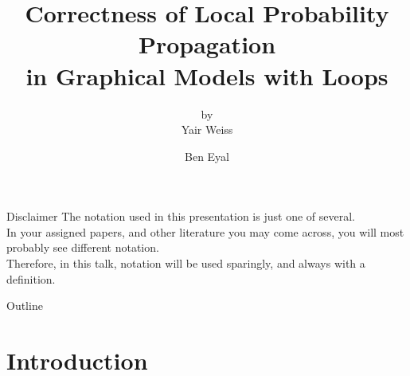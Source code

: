 \documentclass{beamer}
\title[]{Correctness of Local Probability Propagation\\in Graphical Models with Loops}
\subtitle{by\\Yair Weiss}
\author{Ben Eyal}
\begin{document}
\begin{frame}
    \titlepage
\end{frame}

\begin{frame}
    \begin{block}{Disclaimer}
        The notation used in this presentation is just one of several.\\
        In your assigned papers, and other literature you may come across, you will most probably see different notation.\\ Therefore, in this talk, notation will be used sparingly, and always with a definition.
    \end{block}
\end{frame}

\begin{frame}{Outline}
    \tableofcontents
\end{frame}


\section{Introduction}

\end{document}
